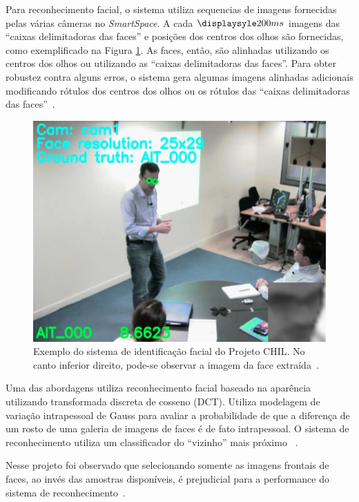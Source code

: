 Para reconhecimento facial, o sistema utiliza sequencias de imagens fornecidas pelas várias câmeras no \textit{SmartSpace}. A cada $\displaysyle 200ms$ imagens das ``caixas delimitadoras das faces'' e posições dos centros dos olhos são fornecidas, como exemplificado na Figura \ref{chil}. As faces, então, são alinhadas utilizando os centros dos olhos ou utilizando as ``caixas delimitadoras das faces''. Para obter robustez contra alguns erros, o sistema gera algumas imagens alinhadas adicionais modificando rótulos dos centros dos olhos ou os rótulos das ``caixas delimitadoras das faces''~\cite{chil}.

	\begin{figure}[hbt]
		\begin{center}
			\includegraphics[scale=0.4]{figuras/3.TrabalhosCorrelatos/chil.png}
		\end{center}
		\caption{Exemplo do sistema de identificação facial do Projeto CHIL. No canto inferior direito, pode-se observar a imagem da face extraída~\cite{chil}.}
		\label{chil}
	\end{figure}

Uma das abordagens utiliza reconhecimento facial baseado na aparência utilizando transformada discreta de cosseno (DCT). Utiliza modelagem de variação intrapessoal de Gauss para avaliar a probabilidade de que a diferença de um rosto de uma galeria de imagens de faces é de fato intrapessoal. O sistema de reconhecimento utiliza um classificador do ``vizinho'' mais próximo ~\cite{chil}.

Nesse projeto foi observado que selecionando somente as imagens frontais de faces, ao invés das amostras disponíveis, é prejudicial para a performance do sistema de reconhecimento~\cite{chil}.

